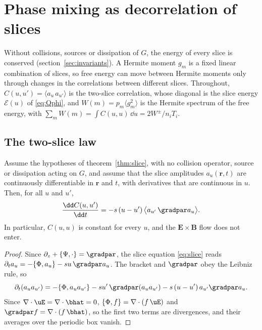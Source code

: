 \section{Phase mixing as decorrelation of slices}\label{sec:decorrelation}

Without collisions, sources or dissipation of $G$, the energy of every slice is conserved (section~\ref{sec:invariants}). A Hermite moment $g_m$ is a fixed linear combination of slices, so free energy can move between Hermite moments only through changes in the correlations between different slices. Throughout, $C(u,u')=\langle a_u\,a_{u'}\rangle$ is the two-slice correlation, whose diagonal is the slice energy $\mathcal E(u)$ of \eqref{eq:Qphi}, and $W(m)=p_m\langle g_m^2\rangle$ is the Hermite spectrum of the free energy, with $\sum_mW(m)=\int C(u,u)\,\dd u=2W^\pm/n_iT_i$.

\subsection{The two-slice law}\label{dec:sec-twoslice}

\begin{proposition}\label{prop:twoslice}
Assume the hypotheses of theorem~\ref{thm:slice}, with no collision operator, source or dissipation acting on $G$, and assume that the slice amplitudes $a_u(\boldsymbol r,t)$ are continuously differentiable in $\boldsymbol r$ and $t$, with derivatives that are continuous in $u$. Then, for all $u$ and $u'$,
\begin{equation}\label{eq:twoslice}
  \frac{\dd C(u,u')}{\dd t}=-s\,(u-u')\,\big\langle a_{u'}\,\gradpar a_u\big\rangle .
\end{equation}
In particular, $C(u,u)$ is constant for every $u$, and the $\boldsymbol E\times\boldsymbol B$ flow does not enter.
\end{proposition}

\begin{proof}
Since $\partial_z+\{\Psi,\cdot\}=\gradpar$, the slice equation \eqref{eq:slice} reads $\partial_ta_u=-\{\Phi,a_u\}-su\,\gradpar a_u$. The bracket and $\gradpar$ obey the Leibniz rule, so
\begin{equation*}
  \partial_t(a_ua_{u'})=-\{\Phi,a_ua_{u'}\}-su'\,\gradpar(a_ua_{u'})-s\,(u-u')\,a_{u'}\gradpar a_u .
\end{equation*}
Since $\nabla\cdot\uE=\nabla\cdot\bhat=0$, $\{\Phi,f\}=\nabla\cdot(f\,\uE)$ and $\gradpar f=\nabla\cdot(f\,\bhat)$, so the first two terms are divergences, and their averages over the periodic box vanish.
\end{proof}

